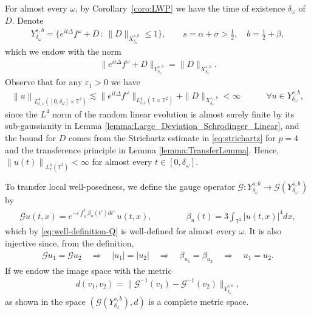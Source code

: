 \documentclass[11pt, xcolor = dvipsnames,reqno
]{amsart}
\theoremstyle{definition}
\theoremstyle{remark}
\begin{document}
For almost every $\omega$, by Corollary~\ref{coro:LWP} we have the time of existence  $\delta_{\omega}$ of $D$. Denote 
\begin{align*}
    Y^{s, b}_{\delta_{\omega}}
    = \big\{ e^{it\Delta} f^{\omega} + D \, : \,  \|D\|_{X^{s, b}_{\delta_{\omega}}} \leq 1 \big\}, 
    \quad \quad s = \alpha + \sigma > \frac12, \quad b = \frac12 + \beta, 
\end{align*}
which we endow with the norm
\begin{align*}
    \|e^{it\Delta}f^\omega + D\|_{Y^{s, b}_{\delta_{\omega}}} = \| D\|_{X^{s, b}_{\delta_{\omega}}}.
\end{align*}
Observe that for any $\varepsilon_1 > 0$ we have
\begin{align}\label{eq:well-definition-Q}
    \left\| u \right\|_{L^4_{t,x}([0,\delta_\omega] \times \mathbb{T}^2)} \lesssim \|e^{i t \Delta} f^{\omega} \|_{L^4_{t,x}(\mathbb T \times \mathbb{T}^2)} + \| D \|_{X^{\varepsilon_1, b}_{\delta_{\omega}}} < \infty
    \qquad \quad \forall u \in Y^{s,b}_{\delta_{\omega}},  
\end{align}
since the $L^4$ norm of the random linear evolution is almost surely finite by its sub-gaussianity in Lemma \ref{lemma:Large_Deviation_Schrodinger_Linear},  and the bound for $D$ comes from the Strichartz estimate in \eqref{eq:strichartz} for $p=4$ and the transference principle in Lemma \ref{lemma:TransferLemma}. 
Hence, $\left\| u(t) \right\|_{L^4_x(\mathbb{T}^2)} < \infty$ for almost every $t \in [0,\delta_\omega]$. 

To transfer local well-posedness, we define the gauge operator $\mathcal{G} : Y^{s,b}_{\delta_{\omega}} \rightarrow \mathcal{G}(Y^{s,b}_{\delta_{\omega}})$ by
\begin{align*}
    \mathcal{G}u(t,x) = e^{-i\int_0^t \beta_u(t')dt'} \, u(t,x) , \qquad \qquad \beta_u(t) = 3 \int_{\mathbb{T}^2} |u(t,x)|^4 dx,
\end{align*}
which by \eqref{eq:well-definition-Q} is well-defined for almost every $\omega$. 
It is also injective since, from the definition, 
\begin{align}
    \mathcal Gu_1 = \mathcal G u_2
    \quad \Longrightarrow \quad 
    |u_1| = |u_2|
    \quad \Longrightarrow \quad 
    \beta_{u_1} = \beta_{u_2}
    \quad \Longrightarrow \quad 
    u_1 = u_2.
\end{align}
If we endow the image space with the metric
\begin{align*}
    d(v_1,v_2) = \big\| \mathcal{G}^{-1} (v_1) - \mathcal{G}^{-1}(v_2) \big\|_{Y^{s,b}_{\delta_{\omega}}}, 
\end{align*}
as shown in \cite{Staffilani1997} the space $(\mathcal{G}(Y^{s,b}_{\delta_{\omega}}),d)$ is a complete metric space. 
\end{document}
